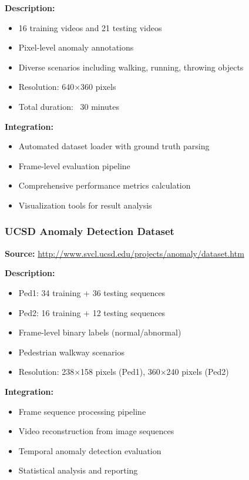 \documentclass[12pt,a4paper]{article}
\begin{document}
\textbf{Description:}
\begin{itemize}
    \item 16 training videos and 21 testing videos
    \item Pixel-level anomaly annotations
    \item Diverse scenarios including walking, running, throwing objects
    \item Resolution: 640×360 pixels
    \item Total duration: ~30 minutes
\end{itemize}

\textbf{Integration:}
\begin{itemize}
    \item Automated dataset loader with ground truth parsing
    \item Frame-level evaluation pipeline
    \item Comprehensive performance metrics calculation
    \item Visualization tools for result analysis
\end{itemize}

\subsubsection{UCSD Anomaly Detection Dataset}
\textbf{Source:} \url{http://www.svcl.ucsd.edu/projects/anomaly/dataset.htm}

\textbf{Description:}
\begin{itemize}
    \item Ped1: 34 training + 36 testing sequences
    \item Ped2: 16 training + 12 testing sequences
    \item Frame-level binary labels (normal/abnormal)
    \item Pedestrian walkway scenarios
    \item Resolution: 238×158 pixels (Ped1), 360×240 pixels (Ped2)
\end{itemize}

\textbf{Integration:}
\begin{itemize}
    \item Frame sequence processing pipeline
    \item Video reconstruction from image sequences
    \item Temporal anomaly detection evaluation
    \item Statistical analysis and reporting
\end{itemize}
\end{document}
